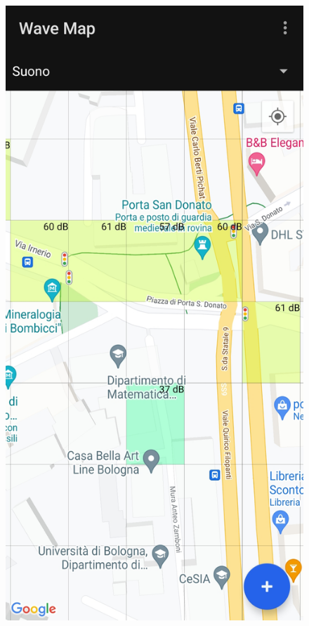 \documentclass[11pt]{article}
\begin{document}
\begin{figure}[H]
    \centering
    \begin{minipage}[b]{0.25\textwidth}
      \includegraphics[width=\textwidth]{./img/overview/map_zoom1.jpg}

\end{minipage}
\end{figure}
\end{document}
